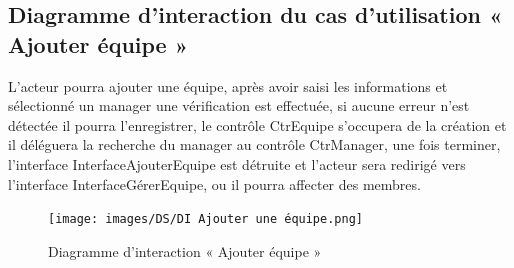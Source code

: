 \begin{itemize}
        \subsection*{Diagramme d'interaction du cas d'utilisation « Ajouter équipe »}
        L’acteur pourra ajouter une équipe, après avoir saisi les informations et sélectionné un manager une vérification est effectuée, si aucune erreur n’est détectée il pourra l’enregistrer, le contrôle CtrEquipe s’occupera de la création et il déléguera la recherche du manager au contrôle CtrManager, une fois terminer, l’interface InterfaceAjouterEquipe est détruite et l’acteur sera redirigé vers l’interface InterfaceGérerEquipe, ou il pourra affecter des membres.
        \clearpage
        \begin{figure}[h!]
                 \centering
                \texttt{[image: images/DS/DI Ajouter une équipe.png]}
                 \caption{Diagramme d'interaction « Ajouter équipe »}
                 \label{fig38}
        \end{figure}
        



\end{itemize}
